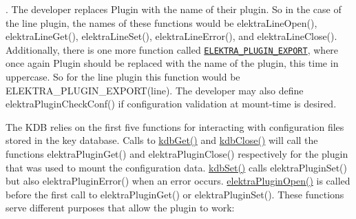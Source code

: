 . The developer replaces {\ttfamily Plugin} with the name of their plugin. So in the case of the line plugin, the names of these functions would be {\ttfamily elektra\+Line\+Open()}, {\ttfamily elektra\+Line\+Get()}, {\ttfamily elektra\+Line\+Set()}, {\ttfamily elektra\+Line\+Error()}, and {\ttfamily elektra\+Line\+Close()}. Additionally, there is one more function called \href{https://doc.libelektra.org/api/latest/html/group__plugin.html#ga8dd092048e972a3f0c9c9f54eb41576e}{\tt E\+L\+E\+K\+T\+R\+A\+\_\+\+P\+L\+U\+G\+I\+N\+\_\+\+E\+X\+P\+O\+RT}, where once again {\ttfamily Plugin} should be replaced with the name of the plugin, this time in uppercase. So for the line plugin this function would be {\ttfamily E\+L\+E\+K\+T\+R\+A\+\_\+\+P\+L\+U\+G\+I\+N\+\_\+\+E\+X\+P\+O\+R\+T(line)}. The developer may also define {\ttfamily elektra\+Plugin\+Check\+Conf()} if configuration validation at mount-\/time is desired.

The K\+DB relies on the first five functions for interacting with configuration files stored in the key database. Calls to {\ttfamily \hyperlink{group__kdb_ga28e385fd9cb7ccfe0b2f1ed2f62453a1}{kdb\+Get()}} and {\ttfamily \hyperlink{group__kdb_gadb54dc9fda17ee07deb9444df745c96f}{kdb\+Close()}} will call the functions {\ttfamily elektra\+Plugin\+Get()} and {\ttfamily elektra\+Plugin\+Close()} respectively for the plugin that was used to mount the configuration data. {\ttfamily \hyperlink{group__kdb_ga11436b058408f83d303ca5e996832bcf}{kdb\+Set()}} calls {\ttfamily elektra\+Plugin\+Set()} but also {\ttfamily elektra\+Plugin\+Error()} when an error occurs. {\ttfamily \hyperlink{elektra_2plugin_8c_a32a70a7876542c51d153164ac5108a57}{elektra\+Plugin\+Open()}} is called before the first call to {\ttfamily elektra\+Plugin\+Get()} or {\ttfamily elektra\+Plugin\+Set()}. These functions serve different purposes that allow the plugin to work\+:


